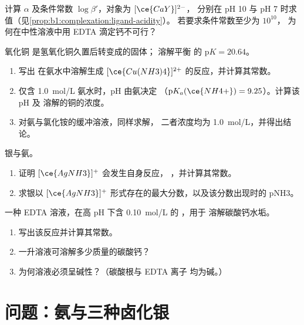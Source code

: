 \begin{exercise}[$\star\star$]\label{exo:b1:complexation:9}
计算 $\alpha$ 及条件常数 $\log\beta'$，对象为 $[\ce{CaY}]^{2-}$，
分别在 pH 10 与 pH 7 时求值（见\cref{prop:b1:complexation:ligand-acidity}）。
若要求条件常数至少为 $10^{10}$，
为何在中性溶液中用 EDTA 滴定钙不可行？
\end{exercise}

\begin{exercise}[$\star\star\star$]\label{exo:b1:complexation:10}
氧化铜  是氢氧化铜久置后转变成的固体；
溶解平衡  的 $\mathrm{p}K = 20.64$。
\begin{enumerate}
  \item 写出  在氨水中溶解生成
        $[\ce{Cu(NH3)4}]^{2+}$ 的反应，并计算其常数。
  \item 仅含 \qty{1.0}{mol/L} 氨水时，pH 由氨决定
        （$\mathrm{p}K_a(\ce{NH4+}) = 9.25$）。计算该 pH 及
        溶解的铜的浓度。
  \item 对氨与氯化铵的缓冲溶液，同样求解，
        二者浓度均为 \qty{1.0}{mol/L}，并得出结论。
\end{enumerate}
\end{exercise}

\begin{exercise}[$\star\star\star$]\label{exo:b1:complexation:11}
银与氨。
\begin{enumerate}
  \item 证明 $[\ce{AgNH3}]^{+}$ 会发生自身反应，
        ，并计算其常数。
  \item 求银以
        $[\ce{AgNH3}]^{+}$ 形式存在的最大分数，以及该分数出现时的 pNH3。
\end{enumerate}
\end{exercise}

\begin{exercise}[$\star\star\star$]\label{exo:b1:complexation:12}
一种 EDTA 溶液，在高 pH 下含 \qty{0.10}{mol/L} 的 ，用于
溶解碳酸钙水垢。
\begin{enumerate}
  \item 写出该反应并计算其常数。
  \item 一升溶液可溶解多少质量的碳酸钙？
  \item 为何溶液必须呈碱性？（碳酸根与 EDTA 离子
        均为碱。）
\end{enumerate}
\end{exercise}

\section{问题：氨与三种卤化银}

